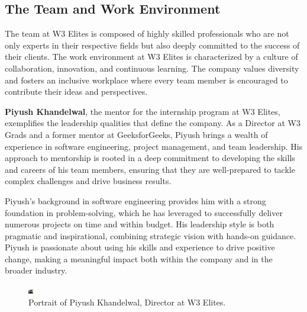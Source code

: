 \subsection{The Team and Work Environment}

The team at W3 Elites is composed of highly skilled professionals who are not only experts in their respective fields but also deeply committed to the success of their clients. The work environment at W3 Elites is characterized by a culture of collaboration, innovation, and continuous learning. The company values diversity and fosters an inclusive workplace where every team member is encouraged to contribute their ideas and perspectives.

\textbf{Piyush Khandelwal}, the mentor for the internship program at W3 Elites, exemplifies the leadership qualities that define the company. As a Director at W3 Grads and a former mentor at GeeksforGeeks, Piyush brings a wealth of experience in software engineering, project management, and team leadership. His approach to mentorship is rooted in a deep commitment to developing the skills and careers of his team members, ensuring that they are well-prepared to tackle complex challenges and drive business results.

Piyush’s background in software engineering provides him with a strong foundation in problem-solving, which he has leveraged to successfully deliver numerous projects on time and within budget. His leadership style is both pragmatic and inspirational, combining strategic vision with hands-on guidance. Piyush is passionate about using his skills and experience to drive positive change, making a meaningful impact both within the company and in the broader industry.

\begin{figure}[h]
    \centering
    \includegraphics[width=0.2cm]{assets/piyush.png}
    \caption{Portrait of Piyush Khandelwal, Director at W3 Elites.}
    \label{fig:piyush_khandelwal}
\end{figure}